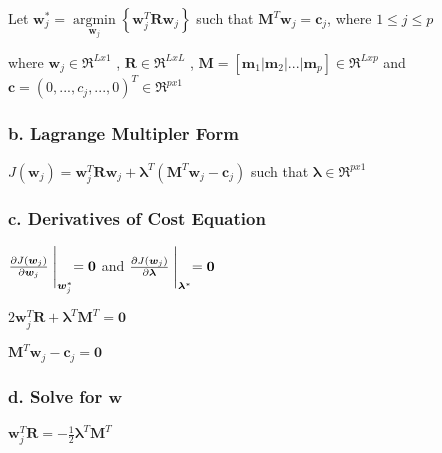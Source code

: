 \documentclass[paper=a4, fontsize=11pt]{scrartcl} %
\numberwithin{equation}{section} %
\numberwithin{figure}{section} %
\numberwithin{table}{section} %
\begin{document}
Let
\hspace{5pt}
\(
\bm{w}_j^* =
\underset{\bm{w}_j}{\operatorname{argmin}}
\left\{
\bm{w}_j^T\bm{R}\bm{w}_j
\right\}
\)
\hspace{8pt} such that \hspace{8pt}
\(
\bm{M}^T\bm{w}_j = \bm{c}_j
\), where \(1\leq j\leq p\)

\vspace{4mm}

where\hspace{5pt}
\(
\bm{w}_j \in \mathfrak{R}^{Lx1}
\)
,\hspace{5pt}
\(
\bm{R} \in \mathfrak{R}^{LxL}
\)
,\hspace{5pt}
\(
\bm{M} = \left[\bm{m}_1 | \bm{m}_2 | ... | \bm{m}_p\right] \in \mathfrak{R}^{Lxp}
\)
\hspace{5pt} and \hspace{5pt}
\(
\bm{c} = (0,...,c_j,...,0)^T \in \mathfrak{R}^{px1}
\)

\subsubsection*{b. Lagrange Multipler Form}

\(
J(\bm{w}_j) = 
\bm{w}_j^T\bm{R}\bm{w}_j + 
\bm{\lambda}^T
\left(\bm{M}^T\bm{w}_j - \bm{c}_j\right)
\)
\hspace{5pt} such that \hspace{5pt}
\(
\bm{\lambda} \in \mathfrak{R}^{px1}
\)

\subsubsection*{c. Derivatives of Cost Equation}
\(
\frac{\partial J(\bm{w}_j)}{\partial \bm{w}_j}\Biggm\lvert_{\bm{w}_j^*}  = \bm{0}
\)
\hspace{5pt}and\hspace{5pt}
\(
\frac{\partial J(\bm{w}_j)}{\partial \bm{\lambda}}\Biggm\lvert_{\bm{\lambda}^*}  = \bm{0}
\)

\vspace{2mm}

\(
2 \bm{w}_j^T\bm{R} + \bm{\lambda}^T\bm{M}^T = \bm{0}
\)

\vspace{2mm}

\(
\bm{M}^T\bm{w}_j - \bm{c}_j = \bm{0}
\)

\subsubsection*{d. Solve for \(\bm{w}\)}
\(
\bm{w}_j^T\bm{R} = -\frac{1}{2}\bm{\lambda}^T\bm{M}^T
\)
\end{document}
